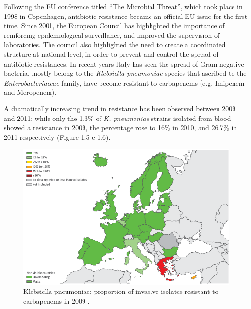 \documentclass[11pt]{report}
\begin{document}
\clearpage
Following the EU conference titled ``The Microbial Threat'', which took place in 1998 in Copenhagen, antibiotic resistance became an official EU issue for the first time.
Since 2001, the European Council has highlighted the importance of reinforcing epidemiological surveillance, and improved the supervision of laboratories.
The council also highlighted the need to create a coordinated structure at national level, in order to prevent and control the spread of antibiotic resistances.
In recent years Italy has seen the spread of Gram-negative bacteria, mostly belong to the \emph{Klebsiella pneumoniae} species that ascribed to the \emph{Enterobacteriaceae} family, have become resistant to carbapenems (e.g. Imipenem and Meropenem).

A dramatically increasing trend in resistance has been observed between 2009 and 2011: while only the 1,3$\%$ of \emph{K. pneumoniae} strains isolated from blood showed a resistance in 2009, the percentage rose to 16$\%$ in 2010, and 26.7$\%$ in 2011 respectively (Figure 1.5 e 1.6).

\begin{figure}[htp]
\centering
\includegraphics[scale=0.60]{img/K.pneu_2009.png}
\caption{Klebsiella pneumoniae: proportion of invasive isolates resistant to carbapenems in 2009 \cite{ECDC_Surveillance}.}
\label{}
\end{figure}
\end{document}
